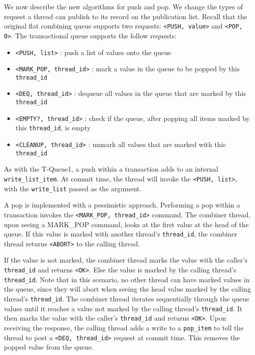 We now describe the new algorithms for push and pop.  We change the types of request a thread can publish to its record on the publication list. Recall that the original flat combining queue supports two requests: \texttt{<PUSH, value>} and \texttt{<POP, 0>}. The transactional queue supports the follow requests:
\begin{itemize}
    \item \texttt{<PUSH, list>} : push a list of values onto the queue
    \item \texttt{<MARK\_POP, thread\_id>} : mark a value in the queue to be popped by this \texttt{thread\_id}
    \item \texttt{<DEQ, thread\_id>} : dequeue all values in the queue that are marked by this \texttt{thread\_id}
    \item \texttt{<EMPTY?, thread\_id>} : check if the queue, after popping all items marked by this \texttt{thread\_id}, is empty
    \item \texttt{<CLEANUP, thread\_id>} : unmark all values that are marked with this \texttt{thread\_id}
\end{itemize}

As with the T-Queue1, a push within a transaction adds to an internal \texttt{write\_list\_item}. At commit time, the thread will invoke the \texttt{<PUSH, list>}, with the \texttt{write\_list} passed as the argument.

A pop is implemented with a pessimistic approach. Performing a pop within a transaction invokes the \texttt{<MARK\_POP, thread\_id>} command. The combiner thread, upon seeing a MARK\_POP command, looks at the first value at the head of the queue. If this value is marked with another thread's \texttt{thread\_id}, the combiner thread returns \texttt{<ABORT>} to the calling thread.

If the value is not marked, the combiner thread marks the value with the caller's \texttt{thread\_id} and returns \texttt{<OK>}. Else the value is marked by the calling thread's \texttt{thread\_id}. Note that in this scenario, no other thread can have marked values in the queue, since they will abort when seeing the head value marked by the calling thread's \texttt{thread\_id}. The combiner thread iterates sequentially through the queue values until it reaches a value not marked by the calling thread's \texttt{thread\_id}. It then marks the value with the caller's \texttt{thread\_id} and returns \texttt{<OK>}. Upon receiving the response, the calling thread adds a write to a \texttt{pop\_item} to tell the thread to post a \texttt{<DEQ, thread\_id>} request at commit time. This removes the popped value from the queue.

